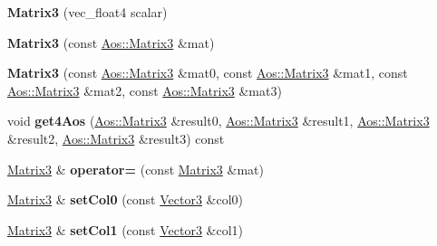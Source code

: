 \begin{DoxyCompactItemize}
\item 
\hypertarget{classVectormath_1_1Soa_1_1Matrix3_a63631bd9d1a83a4994c171f72d20e557}{{\bfseries Matrix3} (vec\-\_\-float4 scalar)}\label{classVectormath_1_1Soa_1_1Matrix3_a63631bd9d1a83a4994c171f72d20e557}

\item 
\hypertarget{classVectormath_1_1Soa_1_1Matrix3_a52a266e8f2a168841f8f0ceb1fb04925}{{\bfseries Matrix3} (const \hyperlink{classVectormath_1_1Aos_1_1Matrix3}{Aos\-::\-Matrix3} \&mat)}\label{classVectormath_1_1Soa_1_1Matrix3_a52a266e8f2a168841f8f0ceb1fb04925}

\item 
\hypertarget{classVectormath_1_1Soa_1_1Matrix3_a75c2a4c51656114a590ed1e5fc222d95}{{\bfseries Matrix3} (const \hyperlink{classVectormath_1_1Aos_1_1Matrix3}{Aos\-::\-Matrix3} \&mat0, const \hyperlink{classVectormath_1_1Aos_1_1Matrix3}{Aos\-::\-Matrix3} \&mat1, const \hyperlink{classVectormath_1_1Aos_1_1Matrix3}{Aos\-::\-Matrix3} \&mat2, const \hyperlink{classVectormath_1_1Aos_1_1Matrix3}{Aos\-::\-Matrix3} \&mat3)}\label{classVectormath_1_1Soa_1_1Matrix3_a75c2a4c51656114a590ed1e5fc222d95}

\item 
\hypertarget{classVectormath_1_1Soa_1_1Matrix3_a278c7feaa14eb851d391d316fea80914}{void {\bfseries get4\-Aos} (\hyperlink{classVectormath_1_1Aos_1_1Matrix3}{Aos\-::\-Matrix3} \&result0, \hyperlink{classVectormath_1_1Aos_1_1Matrix3}{Aos\-::\-Matrix3} \&result1, \hyperlink{classVectormath_1_1Aos_1_1Matrix3}{Aos\-::\-Matrix3} \&result2, \hyperlink{classVectormath_1_1Aos_1_1Matrix3}{Aos\-::\-Matrix3} \&result3) const }\label{classVectormath_1_1Soa_1_1Matrix3_a278c7feaa14eb851d391d316fea80914}

\item 
\hypertarget{classVectormath_1_1Soa_1_1Matrix3_abaf9732c119c7faa786314e202682fc7}{\hyperlink{classVectormath_1_1Soa_1_1Matrix3}{Matrix3} \& {\bfseries operator=} (const \hyperlink{classVectormath_1_1Soa_1_1Matrix3}{Matrix3} \&mat)}\label{classVectormath_1_1Soa_1_1Matrix3_abaf9732c119c7faa786314e202682fc7}

\item 
\hypertarget{classVectormath_1_1Soa_1_1Matrix3_a67f8b52cf3e84e32c8a4e520e34d1da0}{\hyperlink{classVectormath_1_1Soa_1_1Matrix3}{Matrix3} \& {\bfseries set\-Col0} (const \hyperlink{classVectormath_1_1Soa_1_1Vector3}{Vector3} \&col0)}\label{classVectormath_1_1Soa_1_1Matrix3_a67f8b52cf3e84e32c8a4e520e34d1da0}

\item 
\hypertarget{classVectormath_1_1Soa_1_1Matrix3_a92dfdd054993116589005cfa80f339cc}{\hyperlink{classVectormath_1_1Soa_1_1Matrix3}{Matrix3} \& {\bfseries set\-Col1} (const \hyperlink{classVectormath_1_1Soa_1_1Vector3}{Vector3} \&col1)}\label{classVectormath_1_1Soa_1_1Matrix3_a92dfdd054993116589005cfa80f339cc}


\end{DoxyCompactItemize}
